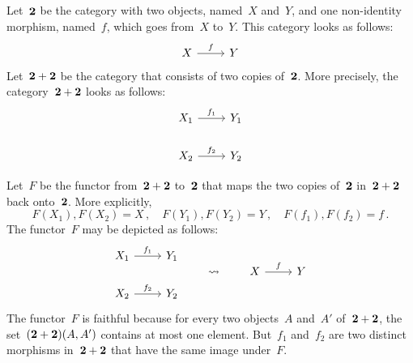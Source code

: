 \subsection{}

Let~$\mathbf{2}$ be the category with two objects, named~$X$ and~$Y$, and one non-identity morphism, named~$f$, which goes from~$X$ to~$Y$.
This category looks as follows:
\[
	\begin{tikzcd}
		X
		\arrow{r}[above]{f}
		&
		Y
	\end{tikzcd}
\]
Let~$\mathbf{2} + \mathbf{2}$ be the category that consists of two copies of~$\mathbf{2}$.
More precisely, the category~$\mathbf{2} + \mathbf{2}$ looks as follows:
\[
	\begin{tikzcd}[row sep = normal]
		X_1
		\arrow{r}[above]{f_1}
		&
		Y_1
		\\
		X_2
		\arrow{r}[above]{f_2}
		&
		Y_2
	\end{tikzcd}
\]

Let~$F$ be the functor from~$\mathbf{2} + \mathbf{2}$ to~$\mathbf{2}$ that maps the two copies of~$\mathbf{2}$ in~$\mathbf{2} + \mathbf{2}$ back onto~$\mathbf{2}$.
More explicitly,
\[
	F(X_1), F(X_2) = X \,,
	\quad
	F(Y_1), F(Y_2) = Y \,,
	\quad
	F(f_1), F(f_2) = f \,.
\]
The functor~$F$ may be depicted as follows:
\[
	\begin{tikzcd}[row sep = normal]
		X_1
		\arrow{r}[above]{f_1}
		&
		Y_1
		\\
		X_2
		\arrow{r}[above]{f_2}
		&
		Y_2
	\end{tikzcd}
	\qquad\leadsto\qquad
	\begin{tikzcd}
		X
		\arrow{r}[above]{f}
		&
		Y
	\end{tikzcd}
\]
The functor~$F$ is faithful because for every two objects~$A$ and~$A'$ of~$\mathbf{2} + \mathbf{2}$, the set~$(\mathbf{2} + \mathbf{2})(A, A')$ contains at most one element.
But~$f_1$ and~$f_2$ are two distinct morphisms in~$\mathbf{2} + \mathbf{2}$ that have the same image under~$F$.
